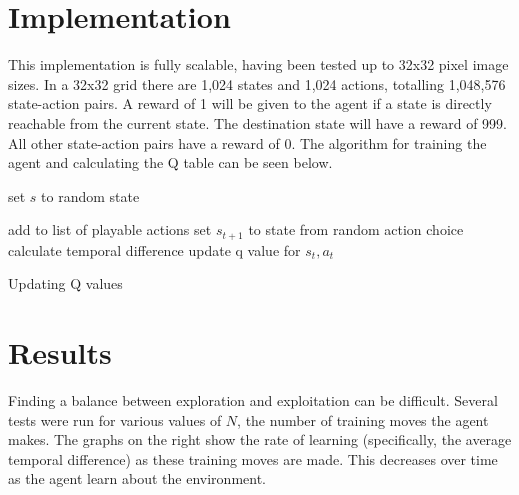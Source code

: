 \documentclass[]{article}
\begin{document}
\section{Implementation}

This implementation is fully scalable, having been tested up to 32x32 pixel image sizes. In a 32x32 grid there are 1,024 states and 1,024 actions, totalling 1,048,576 state-action pairs. A reward of 1 will be given to the agent if a state is directly reachable from the current state. The destination state will have a reward of 999. All other state-action pairs have a reward of 0. The algorithm for training the agent and calculating the Q table can be seen below.

\begin{algorithm}[H]

	\SetAlgoLined

	
	{
		set $s$ to random state\;
		{
			{
				add to list of playable actions\;
			}
			set $s_{t+1}$ to state from random action choice\;
			calculate temporal difference\;
			update q value for $s_t, a_t$\;
		
		}
	}

	\caption{Updating Q values}

\end{algorithm}


\section{Results}

Finding a balance between exploration and exploitation can be difficult. Several tests were run for various values of $N$, the number of training moves the agent makes. The graphs on the right show the rate of learning (specifically, the average temporal difference) as these training moves are made. This decreases over time as the agent learn about the environment.

\clearpage
\end{document}
